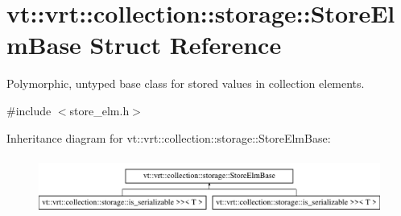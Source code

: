 \hypertarget{structvt_1_1vrt_1_1collection_1_1storage_1_1_store_elm_base}{}\section{vt\+:\+:vrt\+:\+:collection\+:\+:storage\+:\+:Store\+Elm\+Base Struct Reference}
\label{structvt_1_1vrt_1_1collection_1_1storage_1_1_store_elm_base}


Polymorphic, untyped base class for stored values in collection elements.  




{\ttfamily \#include $<$store\+\_\+elm.\+h$>$}

Inheritance diagram for vt\+:\+:vrt\+:\+:collection\+:\+:storage\+:\+:Store\+Elm\+Base\+:\begin{figure}[H]
\begin{center}
\leavevmode
\includegraphics[height=1.898305cm]{structvt_1_1vrt_1_1collection_1_1storage_1_1_store_elm_base}
\end{center}
\end{figure}
